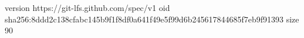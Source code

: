 version https://git-lfs.github.com/spec/v1
oid sha256:8ddd2c138cfabc145b9f1f8df0a641f49e5f99d6b245617844685f7eb9f91393
size 90
